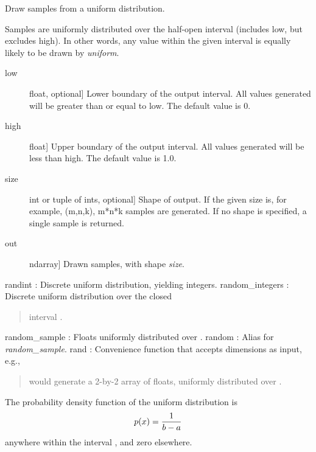 \documentclass[letterpaper,10pt,english]{sphinxmanual}
\begin{document}
\begin{fulllineitems}
\label{pygeomod:pygeomod.geomodeller_xml_obj.uniform}
Draw samples from a uniform distribution.

Samples are uniformly distributed over the half-open interval
\code{{[}low, high)} (includes low, but excludes high).  In other words,
any value within the given interval is equally likely to be drawn
by \emph{uniform}.
\begin{description}
\item[{low}] \leavevmode{[}float, optional{]}
Lower boundary of the output interval.  All values generated will be
greater than or equal to low.  The default value is 0.

\item[{high}] \leavevmode{[}float{]}
Upper boundary of the output interval.  All values generated will be
less than high.  The default value is 1.0.

\item[{size}] \leavevmode{[}int or tuple of ints, optional{]}
Shape of output.  If the given size is, for example, (m,n,k),
m*n*k samples are generated.  If no shape is specified, a single sample
is returned.

\end{description}
\begin{description}
\item[{out}] \leavevmode{[}ndarray{]}
Drawn samples, with shape \emph{size}.

\end{description}

randint : Discrete uniform distribution, yielding integers.
random\_integers : Discrete uniform distribution over the closed
\begin{quote}

interval .
\end{quote}

random\_sample : Floats uniformly distributed over \code{{[}0, 1)}.
random : Alias for \emph{random\_sample}.
rand : Convenience function that accepts dimensions as input, e.g.,
\begin{quote}

 would generate a 2-by-2 array of floats,
uniformly distributed over \code{{[}0, 1)}.
\end{quote}

The probability density function of the uniform distribution is
\begin{gather}
\begin{split}p(x) = \frac{1}{b - a}\end{split}\notag
\end{gather}
anywhere within the interval \code{{[}a, b)}, and zero elsewhere.


\end{fulllineitems}
\end{document}
